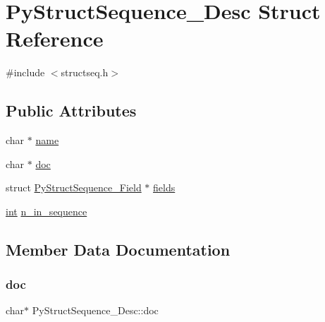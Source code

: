 \hypertarget{struct_py_struct_sequence___desc}{}\section{Py\+Struct\+Sequence\+\_\+\+Desc Struct Reference}
\label{struct_py_struct_sequence___desc}


{\ttfamily \#include $<$structseq.\+h$>$}

\subsection*{Public Attributes}
\begin{DoxyCompactItemize}
\item 
char $\ast$ \mbox{\hyperlink{struct_py_struct_sequence___desc_ae3d6a21652f0c9e62670e79ddad60045}{name}}
\item 
char $\ast$ \mbox{\hyperlink{struct_py_struct_sequence___desc_a96a9c56395cf81931030bbb69a1ce504}{doc}}
\item 
struct \mbox{\hyperlink{struct_py_struct_sequence___field}{Py\+Struct\+Sequence\+\_\+\+Field}} $\ast$ \mbox{\hyperlink{struct_py_struct_sequence___desc_a072f27b442529f33fb31732eda6b315c}{fields}}
\item 
\mbox{\hyperlink{warnings_8h_a74f207b5aa4ba51c3a2ad59b219a423b}{int}} \mbox{\hyperlink{struct_py_struct_sequence___desc_a8a294c7934e6ac8ee4ad5cf0d1496d28}{n\+\_\+in\+\_\+sequence}}
\end{DoxyCompactItemize}


\subsection{Member Data Documentation}
\mbox{\label{struct_py_struct_sequence___desc_a96a9c56395cf81931030bbb69a1ce504}} 
\subsubsection{\texorpdfstring{doc}{doc}}
{\footnotesize\ttfamily char$\ast$ Py\+Struct\+Sequence\+\_\+\+Desc\+::doc}

\mbox{\label{struct_py_struct_sequence___desc_a072f27b442529f33fb31732eda6b315c}} 
